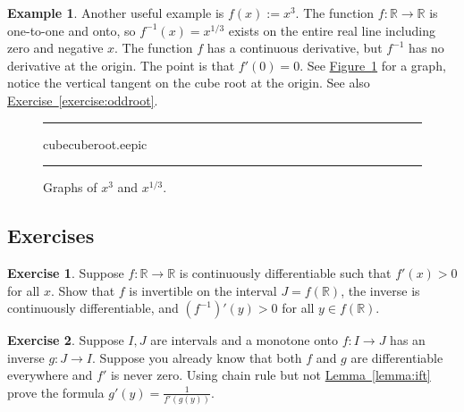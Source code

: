 \documentclass[12pt]{book}
\newenvironment{myfigureht}{%
\begin{figure}[h!t]
\noindent\rule{\textwidth}{0.4pt}\vspace{12pt}\par\centering}%
{\par\noindent\rule{\textwidth}{0.4pt}
\end{figure}}
\newcommand{\R}{{\mathbb{R}}}
\theoremstyle{plain}
\theoremstyle{remark}
\theoremstyle{definition}
\theoremstyle{exercise}
\newtheorem{exercise}{Exercise}[section]
\theoremstyle{example}
\newtheorem{example}[thm]{Example}
\newcommand{\figureref}[1]{\hyperref[#1]{Figure~\ref*{#1}}}
\newcommand{\exerciseref}[1]{\hyperref[#1]{Exercise~\ref*{#1}}}
\newcommand{\lemmaref}[1]{\hyperref[#1]{Lemma~\ref*{#1}}}
\begin{document}
\begin{example}
Another useful example is $f(x) := x^3$.  The function $f \colon \R \to \R$ is
one-to-one and onto, so $f^{-1}(x) = x^{1/3}$ exists on the entire real
line including zero and negative $x$.  The function $f$ has
a continuous derivative, but $f^{-1}$ has no derivative at the origin.  The
point is that $f'(0) = 0$.  See \figureref{cubecuberootfig} for a graph,
notice the vertical tangent on the cube root at the origin.
See also \exerciseref{exercise:oddroot}.
\begin{myfigureht}
{cubecuberoot.eepic}
\caption{Graphs of $x^3$ and $x^{1/3}$.\label{cubecuberootfig}}
\end{myfigureht}
\end{example}


\subsection{Exercises}

\begin{exercise}
Suppose $f \colon \R \to \R$ is continuously differentiable such that
$f'(x) > 0$ for all $x$.  Show that $f$ is invertible on the interval $J =
f(\R)$, the inverse is continuously differentiable, and ${(f^{-1})}'(y) >
0$ for all $y \in f(\R)$.
\end{exercise}


\begin{exercise}
Suppose $I,J$ are intervals and a monotone onto $f \colon I \to J$ has an inverse $g \colon J \to I$.
Suppose you already know that both $f$ and $g$ are differentiable
everywhere and $f'$ is never zero.  Using chain rule but not \lemmaref{lemma:ift} prove the
formula $g'(y) = \frac{1}{f'(g(y))}$. %
\end{exercise}
\end{document}
